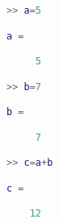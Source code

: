 \begin{lstlisting}[language=matlab]
>> a=5

a =

     5

>> b=7

b =

     7

>> c=a+b

c =

    12

\end{lstlisting}